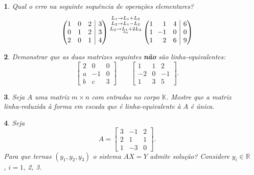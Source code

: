 \documentclass[12pt]{exam}
\makeatletter
\newenvironment{amatrix}[1]{%
  \left(\begin{array}{@{}*{#1}{r}|r@{}}
}{%
  \end{array}\right)
}
\newtheorem{exercicio}{}
\newcommand{\real}{\mathbb{R}}
\newcommand{\cp}[1]{\mathbb{#1}}
\makeatother
\begin{document}
\begin{exercicio}
  Qual o erro na seguinte sequ\^encia de opera\c{c}\~oes elementares?
    \begin{align*}
      \begin{amatrix}{3} 
        1 & 0 & 2 & 3 \\ 
        0 & 1 & 2& 3 \\
        2 & 0 & 1 & 4 \\
      \end{amatrix} 
      \stackrel{L_1 \to L_1+L_2}{
      \stackrel{L_2 \to L_1-L_2}{ 
      \stackrel{L_3 \to  L_1+2L_2}{\sim}}}
      \begin{amatrix}{3} 
      1 & 1 & 4 & 6 \\
      1 & \!\!-1 & 0& 0 \\
      1 & 2 & 6 & 9 
      \end{amatrix}
    \end{align*}
\end{exercicio}

\begin{exercicio}
  Demonstrar que as duas matrizes seguintes \textbf{n\~ao} s\~ao linha-equivalentes:
  \[
    \begin{bmatrix}
      2 & 0 & 0\\
      a & -1 & 0\\
      b & c & 3
    \end{bmatrix} \qquad
    \begin{bmatrix}
      1 & 1 & 2\\
      -2 & 0 & -1\\
      1 & 3 & 5
    \end{bmatrix}.
  \]
\end{exercicio}

\begin{exercicio}
  Seja $A$ uma matriz $m \times n$ com entradas no corpo $\cp{K}$. Mostre que a matriz linha-reduzida \`a forma em escada que \'e linha-equivalente \`a $A$ \'e \'unica.
\end{exercicio}

\begin{exercicio}
  Seja
  \[
    A = \begin{bmatrix}
      3 & -1 & 2\\
      2 & 1 & 1\\
      1 & -3 & 0
    \end{bmatrix}.
  \]
  Para que ternas $(y_1, y_2, y_3)$ o sistema $AX = Y$ admite solu\c{c}\~ao? Considere $y_i \in \real$, $i=1$, 2, 3.
\end{exercicio}
\end{document}
